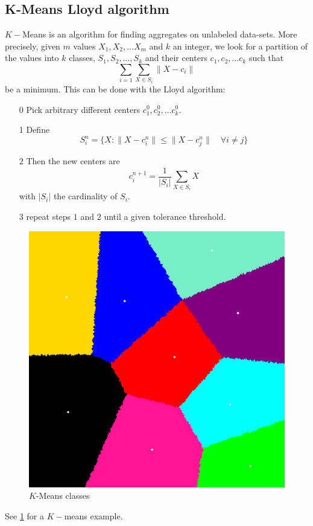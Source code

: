 \documentclass[DIV=calc, paper=a4, fontsize=11pt, twocolumn]{scrartcl}
\begin{document}
\subsection{K-Means Lloyd algorithm}
$K-$Means is an algorithm for finding aggregates on unlabeled data-sets. More precisely, given $m$ values $X_1, X_2, \ldots X_m$ and $k$ an integer, we look for a partition of the values into $k$ classes, $S_1, S_2,\ldots, S_k$  and their centers $c_1, c_2, \ldots c_k$ such that
$$\sum_{i = 1} \sum_{X \in S_i} \| X-c_i\|$$
be a minimum. This can be done with the Lloyd algorithm:
\begin{itemize}
  \item[0] Pick arbitrary different centers $c_1^0, c_2^0, \ldots c_k^0$.
  \item[1] Define       
    $$S_i^n = \{ X : \| X - c_i^n \| \leq \|X - c_j^n \| \quad \forall i \neq j \}$$
  \item[2] Then the new centers are
    $$c_i^{n+1} = \frac{1}{|S_i|} \sum_{X \in S_i} X$$
with $|S_i|$ the cardinality of $S_i$.
  \item[3] repeat steps $1$ and $2$ until a given tolerance threshold.
\end{itemize}
\begin{figure}
  \centering
    \includegraphics[width=0.5\linewidth]{centers}
  \caption{$K$-Means classes}
  \label{fig:kmeans}
\end{figure}
See \ref{fig:kmeans} for a $K-$means example.
\end{document}
